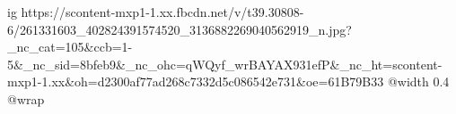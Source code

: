  
 
 
 
 

\ifcmt
  ig https://scontent-mxp1-1.xx.fbcdn.net/v/t39.30808-6/261331603_402824391574520_3136882269040562919_n.jpg?_nc_cat=105&ccb=1-5&_nc_sid=8bfeb9&_nc_ohc=qWQyf_wrBAYAX931efP&_nc_ht=scontent-mxp1-1.xx&oh=d2300af77ad268c7332d5c086542e731&oe=61B79B33
  @width 0.4
  @wrap 
\fi
